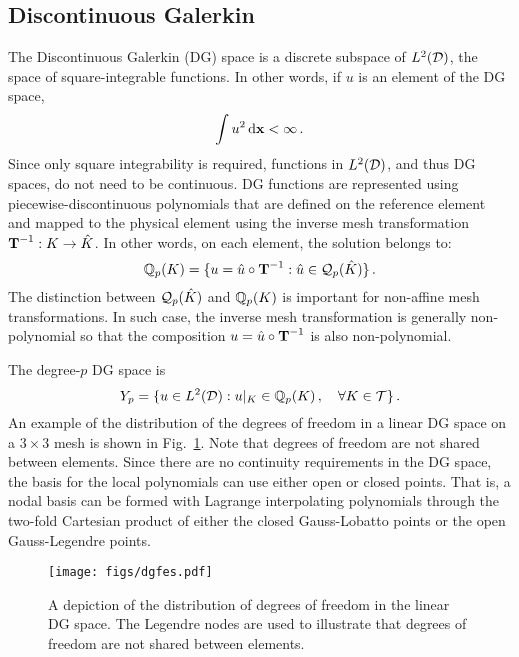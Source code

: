 \documentclass[../doc.tex]{subfiles}
\begin{document}
\subsection{Discontinuous Galerkin} \label{fem_sec:dg}
The Discontinuous Galerkin (DG) space is a discrete subspace of $L^2(\mathcal{D})$, the space of square-integrable functions. In other words, if $u$ is an element of the DG space, 
	\begin{equation}
		\int u^2 \mathop{}\!\mathrm{d} \boldsymbol{\mathrm{x}} < \infty \,. 
	\end{equation}
Since only square integrability is required, functions in $L^2(\mathcal{D})$, and thus DG spaces, do not need to be continuous. DG functions are represented using piecewise-discontinuous polynomials that are defined on the reference element and mapped to the physical element using the inverse mesh transformation $\boldsymbol{\mathrm{T}}^{-1}: K \rightarrow \hat{K}$. In other words, on each element, the solution belongs to: 
	\begin{equation}
		\mathbb{Q}_{p}(K) = \{ u = \hat{u} \circ \boldsymbol{\mathrm{T}}^{-1} : \hat{u} \in \mathcal{Q}_p(\hat{K}) \}\,. 
	\end{equation}
The distinction between $\mathcal{Q}_{p}(\hat{K})$ and $\mathbb{Q}_{p}(K)$ is important for non-affine mesh transformations. In such case, the inverse mesh transformation is generally non-polynomial so that the composition $u = \hat{u}\circ\boldsymbol{\mathrm{T}}^{-1}$ is also non-polynomial. 

The degree-$p$ DG space is 
	\begin{equation}
		Y_p = \{ u \in L^2(\mathcal{D}) : u|_{K} \in \mathbb{Q}_{p}(K) \,, \quad \forall K \in \mathcal{T} \} \,. 
	\end{equation}
An example of the distribution of the degrees of freedom in a linear DG space on a $3\times 3$ mesh is shown in Fig.~\ref{fem:dgfes}. Note that degrees of freedom are not shared between elements. Since there are no continuity requirements in the DG space, the basis for the local polynomials can use either open or closed points. That is, a nodal basis can be formed with Lagrange interpolating polynomials through the two-fold Cartesian product of either the closed Gauss-Lobatto points or the open Gauss-Legendre points. 
\begin{figure}
\centering
\texttt{[image: figs/dgfes.pdf]}
\caption{A depiction of the distribution of degrees of freedom in the linear DG space. The Legendre nodes are used to illustrate that degrees of freedom are not shared between elements. }
\label{fem:dgfes}
\end{figure}
\end{document}
